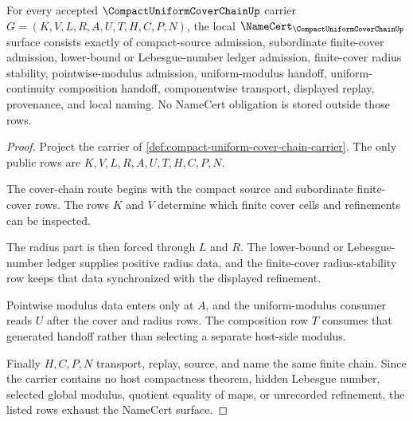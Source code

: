 \begin{theorem}
\label{thm:compact-uniform-cover-chain-namecert-obligations}
For every accepted $\CompactUniformCoverChainUp$ carrier $G=(K,V,L,R,A,U,T,H,C,P,N)$, the local $\NameCert_{\CompactUniformCoverChainUp}$ surface consists exactly of compact-source admission, subordinate finite-cover admission, lower-bound or Lebesgue-number ledger admission, finite-cover radius stability, pointwise-modulus admission, uniform-modulus handoff, uniform-continuity composition handoff, componentwise transport, displayed replay, provenance, and local naming. No NameCert obligation is stored outside those rows.
\end{theorem}
\begin{proof}
Project the carrier of \autoref{def:compact-uniform-cover-chain-carrier}. The only public rows are $K,V,L,R,A,U,T,H,C,P,N$.

The cover-chain route begins with the compact source and subordinate finite-cover rows. The rows $K$ and $V$ determine which finite cover cells and refinements can be inspected.

The radius part is then forced through $L$ and $R$. The lower-bound or Lebesgue-number ledger supplies positive radius data, and the finite-cover radius-stability row keeps that data synchronized with the displayed refinement.

Pointwise modulus data enters only at $A$, and the uniform-modulus consumer reads $U$ after the cover and radius rows. The composition row $T$ consumes that generated handoff rather than selecting a separate host-side modulus.

Finally $H,C,P,N$ transport, replay, source, and name the same finite chain. Since the carrier contains no host compactness theorem, hidden Lebesgue number, selected global modulus, quotient equality of maps, or unrecorded refinement, the listed rows exhaust the NameCert surface.
\end{proof}

